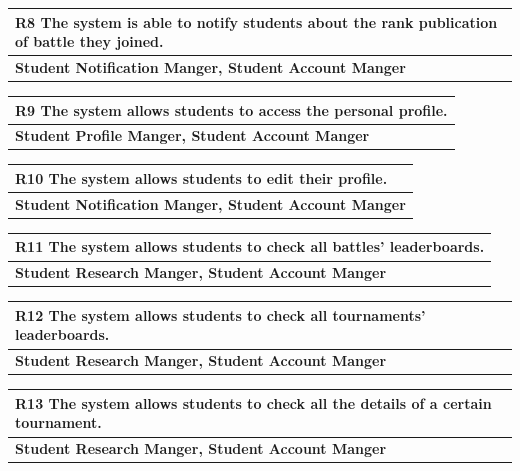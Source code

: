 \documentclass[12pt, a4paper]{report}
\begin{document}
\begin{table}[H]
    \begin{tabularx}{\textwidth}{X}
    \textbf{R8} The system is able to notify students about the rank publication of
    battle they joined.\\
    \hline 
    \textbf{Student Notification Manger, Student Account Manger}
    \end{tabularx}
\end{table}

\begin{table}[H]
    \begin{tabularx}{\textwidth}{X}
    \textbf{R9} The system allows students to access the personal profile.\\
    \hline 
    \textbf{Student Profile Manger, Student Account Manger}
\end{tabularx}
\end{table}

\begin{table}[H]
    \begin{tabularx}{\textwidth}{X}
    \textbf{R10} The system allows students to edit their profile.\\
    \hline 
    \textbf{Student Notification Manger, Student Account Manger}
\end{tabularx}
\end{table}

\begin{table}[H]
    \begin{tabularx}{\textwidth}{X}
    \textbf{R11} The system allows students to check all battles' leaderboards.\\
    \hline 
    \textbf{Student Research Manger, Student Account Manger}
\end{tabularx}
\end{table}

\begin{table}[H]
    \begin{tabularx}{\textwidth}{X}
    \textbf{R12} The system allows students to check all tournaments' leaderboards.\\
    \hline 
    \textbf{Student Research Manger, Student Account Manger}
\end{tabularx}
\end{table}

\begin{table}[H]
    \begin{tabularx}{\textwidth}{X}
    \textbf{R13} The system allows students to check all the details of a certain tournament.\\
    \hline 
    \textbf{Student Research Manger, Student Account Manger}
\end{tabularx}
\end{table}
\end{document}
